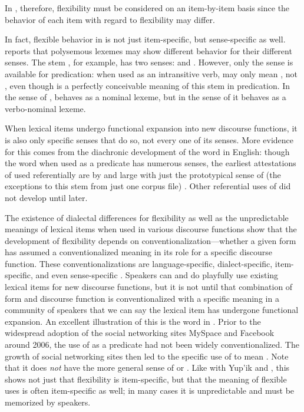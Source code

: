 \noindent In , therefore, flexibility must be considered on an item-by-item basis since the behavior of each item with regard to flexibility may differ.

In fact, flexible behavior in  is not just item-specific, but sense-specific as well. \textcite[54]{Creissels2017} reports that polysemous lexemes may show different behavior for their different senses. The stem , for example, has two senses:  and . However, only the  sense is available for predication: when used as an intransitive verb,  may only mean , not , even though  is a perfectly conceivable meaning of this stem in predication. In the sense of ,  behaves as a nominal lexeme, but in the sense of  it behaves as a verbo-nominal lexeme.

When lexical items undergo functional expansion into new discourse functions, it is also only specific senses that do so, not every one of its senses. More evidence for this comes from the diachronic development of the word  in English: though the word  when used as a predicate has numerous senses, the earliest attestations of  used referentially are by and large with just the prototypical sense of  (the exceptions to this stem from just one corpus file) \parencite[76]{Gries2006}. Other referential uses of  did not develop until later.

The existence of dialectal differences for flexibility as well as the unpredictable meanings of lexical items when used in various discourse functions show that the development of flexibility depends on conventionalization—whether a given form has assumed a conventionalized meaning in its role for a specific discourse function. These conventionalizations are language-specific, dialect-specific, item-specific, and even sense-specific \parencite[97]{Croft2000}. Speakers can and do playfully use existing lexical items for new discourse functions, but it is not until that combination of form and discourse function is conventionalized with a specific meaning in a community of speakers that we can say the lexical item has undergone functional expansion. An excellent illustration of this is the word  in . Prior to the widespread adoption of the social networking sites MySpace and Facebook around 2006, the use of  as a predicate had not been widely conventionalized. The growth of social networking sites then led to the specific use of  to mean . Note that it does \emph{not} have the more general sense of  or . Like with Yup'ik and , this shows not just that flexibility is item-specific, but that the meaning of flexible uses is often item-specific as well; in many cases it is unpredictable and must be memorized by speakers.

